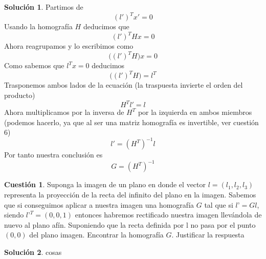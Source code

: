 \documentclass[a4paper, 11pt]{article}
\theoremstyle{definition}
\newtheorem{cuestion}{Cuestión}
\newtheorem*{solucion}{Solución}
\begin{document}
  \begin{solucion}
      Partimos de
      $$(l')^T x' = 0$$
      Usando la homografía $H$ deducimos que
      $$(l')^T Hx = 0$$
      Ahora reagrupamos y lo escribimos como
      $$\big((l')^T H\big)x = 0$$
      Como sabemos que $l^T x = 0$  deducimos
      $$\big((l')^T H\big) = l^T$$
      Trasponemos ambos lados de la ecuación (la traspuesta invierte el orden del producto)
      $$H^T l' = l$$
      Ahora multiplicamos por la inversa de $H^T$ por la izquierda en ambos miembros
      (podemos hacerlo, ya que al ser una matriz homografía es invertible, ver cuestión
      6)
      $$l' = (H^T)^{-1} l$$
      Por tanto nuestra conclusión es
      $$G = (H^T)^{-1}$$
  \end{solucion}

  \begin{cuestion}
    Suponga la imagen de un plano en donde el vector $l=(l_1,l_2,l_3)$ representa
    la proyección de la recta del infinito del plano en la imagen. Sabemos que si
    conseguimos aplicar a nuestra imagen una homografía $G$ tal que si $l’= Gl$, siendo
    $l’^T =(0,0,1)$ entonces habremos rectificado nuestra imagen llevándola de nuevo
    al plano afín. Suponiendo que la recta definida por l no pasa por el punto $(0,0)$
    del plano imagen. Encontrar la homografía $G$. Justificar la respuesta

  \end{cuestion}

  \begin{solucion}
    cosas
  \end{solucion}
\end{document}
